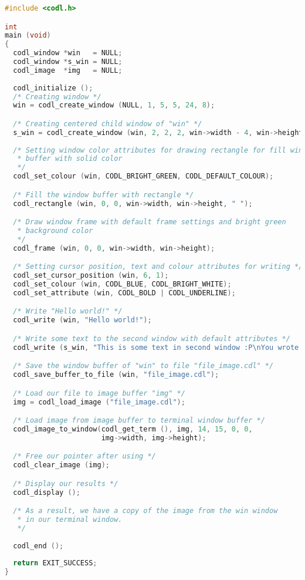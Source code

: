 \documentclass{article}
\begin{document}
\begin{lstlisting}[language=C]
#include <codl.h>

int
main (void)
{
  codl_window *win   = NULL;
  codl_window *s_win = NULL;
  codl_image  *img   = NULL;
  
  codl_initialize ();
  /* Creating window */
  win = codl_create_window (NULL, 1, 5, 5, 24, 8);

  /* Creating centered child window of "win" */
  s_win = codl_create_window (win, 2, 2, 2, win->width - 4, win->height - 4);
  
  /* Setting window color attributes for drawing rectangle for fill window 
   * buffer with solid color 
   */
  codl_set_colour (win, CODL_BRIGHT_GREEN, CODL_DEFAULT_COLOUR);

  /* Fill the window buffer with rectangle */
  codl_rectangle (win, 0, 0, win->width, win->height, " ");

  /* Draw window frame with default frame settings and bright green 
   * background color 
   */
  codl_frame (win, 0, 0, win->width, win->height);

  /* Setting cursor position, text and colour attributes for writing */
  codl_set_cursor_position (win, 6, 1);
  codl_set_colour (win, CODL_BLUE, CODL_BRIGHT_WHITE);
  codl_set_attribute (win, CODL_BOLD | CODL_UNDERLINE);

  /* Write "Hello world!" */
  codl_write (win, "Hello world!");

  /* Write some text to the second window with default attributes */
  codl_write (s_win, "This is some text in second window :P\nYou wrote: ");

  /* Save the window buffer of "win" to file "file_image.cdl" */
  codl_save_buffer_to_file (win, "file_image.cdl");

  /* Load our file to image buffer "img" */
  img = codl_load_image ("file_image.cdl");

  /* Load image from image buffer to terminal window buffer */
  codl_image_to_window(codl_get_term (), img, 14, 15, 0, 0,
                       img->width, img->height);

  /* Free our pointer after using */
  codl_clear_image (img);

  /* Display our results */
  codl_display ();

  /* As a result, we have a copy of the image from the win window
   * in our terminal window.
   */
  
  codl_end ();
  
  return EXIT_SUCCESS;
}
\end{lstlisting}
\end{document}
